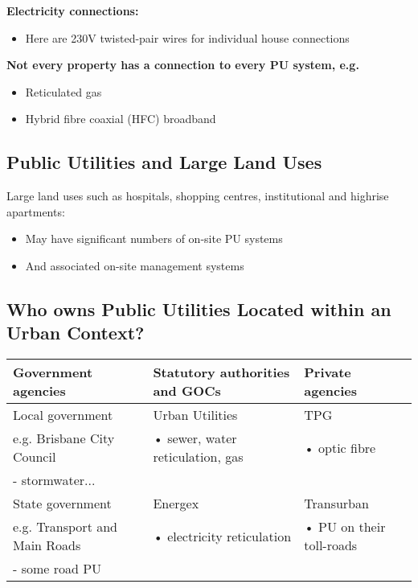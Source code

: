 \documentclass{report}
\begin{document}
	\textbf{Electricity connections:}
	\begin{itemize}
		\item Here are 230V twisted-pair wires for individual house connections
	\end{itemize}

	\textbf{Not every property has a connection to every PU system, e.g.}
	\begin{itemize}
		\item Reticulated gas
		\item Hybrid fibre coaxial (HFC) broadband
	\end{itemize}

	\subsection{Public Utilities and Large Land Uses}

	Large land uses such as hospitals, shopping centres, institutional and highrise apartments:
	\begin{itemize}
		\item May have significant numbers of on-site PU systems
		\item And associated on-site management systems
	\end{itemize}

	\subsection{Who owns Public Utilities Located within an Urban Context?}

	\begin{table}[!h]
	\centering
	\begin{tabular}{|l|l|l|}
	\hline
	\textbf{Government agencies} & \textbf{Statutory authorities and GOCs} & \textbf{Private agencies} \\
	\hline
	Local government & Urban Utilities & TPG \\
	e.g. Brisbane City Council & • sewer, water reticulation, gas & • optic fibre \\
	- stormwater... & & \\
	\hline
	State government & Energex & Transurban \\
	e.g. Transport and Main Roads & • electricity reticulation & • PU on their toll-roads \\
	- some road PU & & \\
	\hline
	\end{tabular}
	\end{table}
\end{document}
